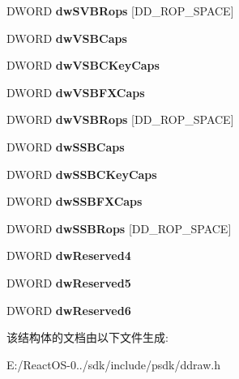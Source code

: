 \begin{DoxyCompactItemize}
D\+W\+O\+RD {\bfseries dw\+S\+V\+B\+Rops} \mbox{[}D\+D\+\_\+\+R\+O\+P\+\_\+\+S\+P\+A\+CE\mbox{]}
\item 
\mbox{\label{struct___d_d_c_a_p_s___d_x3_a0e72766bfb105102b8ea3a3d7be000df}} 
D\+W\+O\+RD {\bfseries dw\+V\+S\+B\+Caps}
\item 
\mbox{\label{struct___d_d_c_a_p_s___d_x3_a00a3575146996c5cf08e02de049d35dc}} 
D\+W\+O\+RD {\bfseries dw\+V\+S\+B\+C\+Key\+Caps}
\item 
\mbox{\label{struct___d_d_c_a_p_s___d_x3_a5bec2d5bf1a164b8fa8e61735dbe475b}} 
D\+W\+O\+RD {\bfseries dw\+V\+S\+B\+F\+X\+Caps}
\item 
\mbox{\label{struct___d_d_c_a_p_s___d_x3_ac4d7bb3f179545cb436a26a37d56d1be}} 
D\+W\+O\+RD {\bfseries dw\+V\+S\+B\+Rops} \mbox{[}D\+D\+\_\+\+R\+O\+P\+\_\+\+S\+P\+A\+CE\mbox{]}
\item 
\mbox{\label{struct___d_d_c_a_p_s___d_x3_a6f0c82690439d3312eec2c8f96d94dd9}} 
D\+W\+O\+RD {\bfseries dw\+S\+S\+B\+Caps}
\item 
\mbox{\label{struct___d_d_c_a_p_s___d_x3_a81db4cca68329a184a3ba4f95e1f97cf}} 
D\+W\+O\+RD {\bfseries dw\+S\+S\+B\+C\+Key\+Caps}
\item 
\mbox{\label{struct___d_d_c_a_p_s___d_x3_acd57bbb6d92887fdbb36fb493d795661}} 
D\+W\+O\+RD {\bfseries dw\+S\+S\+B\+F\+X\+Caps}
\item 
\mbox{\label{struct___d_d_c_a_p_s___d_x3_a204af5af42da8f9a7cf5ef5955631393}} 
D\+W\+O\+RD {\bfseries dw\+S\+S\+B\+Rops} \mbox{[}D\+D\+\_\+\+R\+O\+P\+\_\+\+S\+P\+A\+CE\mbox{]}
\item 
\mbox{\label{struct___d_d_c_a_p_s___d_x3_a44e8e4cf5dcc71f7cb740cf1ab9c183f}} 
D\+W\+O\+RD {\bfseries dw\+Reserved4}
\item 
\mbox{\label{struct___d_d_c_a_p_s___d_x3_ad81d4c87111fec1492d2f6a31a8cdeeb}} 
D\+W\+O\+RD {\bfseries dw\+Reserved5}
\item 
\mbox{\label{struct___d_d_c_a_p_s___d_x3_a9a937cf8313db7ee4614f0170aa1daf0}} 
D\+W\+O\+RD {\bfseries dw\+Reserved6}
\end{DoxyCompactItemize}


该结构体的文档由以下文件生成\+:\begin{DoxyCompactItemize}
\item 
E\+:/\+React\+O\+S-\/0../sdk/include/psdk/ddraw.\+h\end{DoxyCompactItemize}
